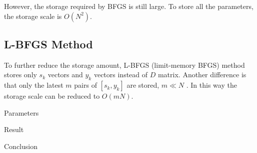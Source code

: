 However, the storage required by BFGS is still large. To store all the parameters, the storage scale is $O(N^2)$.

\subsection{L-BFGS Method}
To further reduce the storage amount, L-BFGS (limit-memory BFGS) method stores only $s_k$ vectors and $y_k$ vectors instead of $D$ matrix. Another difference is that only the latest $m$ pairs of $[s_k, y_k]$ are stored, $m\ll N$ . In this way the storage scale can be reduced to $O(mN)$.


Parameters

Result 

Conclusion
